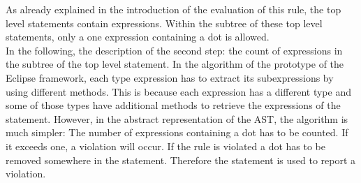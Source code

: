 As already explained in the introduction of the evaluation of this rule, the top level statements contain expressions. Within the subtree of these top level statements, only a one expression containing a dot is allowed.
\\

In the following, the description of the second step: the count of expressions in the subtree of the top level statement. In the algorithm of the prototype of the Eclipse framework, each type expression has to extract its subexpressions by using different methods. This is because each expression has a different type and some of those types have additional methods to retrieve the expressions of the statement. However, in the abstract representation of the \ac{AST}, the algorithm is much simpler: The number of expressions containing a dot has to be counted. If it exceeds one, a violation will occur. If the rule is violated a dot has to be removed somewhere in the statement. Therefore the statement is used to report a violation.
\\


